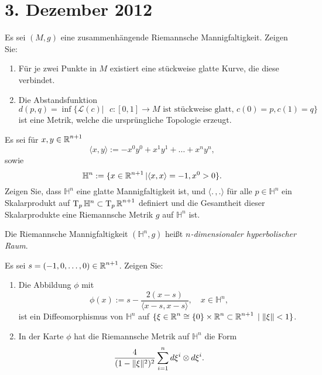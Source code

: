 
\section{3. Dezember 2012}
\setcounter{Aufg}{0} %
\setcounter{Loes}{0}

\begin{Aufg}
Es sei $(M,g)$ eine zusammenhängende Riemannsche Mannigfaltigkeit. Zeigen Sie:
\begin{enumerate}[label=\alph*),leftmargin=*,widest=b]
\item
	Für je zwei Punkte in $M$ existiert eine stückweise glatte Kurve, die diese verbindet.
\item
	Die Abstandsfunktion 
		\[d(p,q)=\inf\{\mathcal{L}(c)|\text{ $c:[0,1] \to M$ ist stückweise glatt, } c(0)=p, c(1)=q\}\]
	ist eine Metrik, welche die ursprüngliche Topologie erzeugt.
\end{enumerate}\end{Aufg}

\begin{Aufg}
Es sei für $x,y\in \operatorname{\mathbb{R}}^{n+1}$ 
	\[\langle x,y \rangle:= - x^0 y^0 + x^1 y^1 +\dots + x^n y^n,\]
sowie 
	\[\mathbb{H}^n:= \{x\in \operatorname{\mathbb{R}}^{n+1}| \langle x,x \rangle =-1, x^0 > 0\}.\]
Zeigen Sie, dass $\mathbb{H}^n$ eine glatte Mannigfaltigkeit ist, und $\langle. \,, . \rangle$ für alle $p\in \mathbb{H}^n$ ein Skalarprodukt auf $\operatorname{T}_p \mathbb{H}^n \subset \operatorname{T}_p \operatorname{\mathbb{R}}^{n+1}$   definiert und die Gesamtheit dieser Skalarprodukte eine Riemannsche Metrik $g$ auf $\mathbb{H}^n$ ist.

Die Riemannsche Mannigfaltigkeit $(\mathbb{H}^n, g)$ heißt \emph{$n$-dimensionaler hyperbolischer Raum}.
\end{Aufg}

\begin{Aufg}
Es sei $s=(-1,0,\dots,0) \in \operatorname{\mathbb{R}}^{n+1}$. Zeigen Sie:
\begin{enumerate}[label=\alph*),leftmargin=*,widest=b]
\item
	Die Abbildung $\phi$ mit 
		\[\phi(x):=s-\frac{2 (x-s)}{\langle x-s,x-s\rangle}, \quad x\in \mathbb{H}^n, \]
	ist ein Diffeomorphismus von $\mathbb{H}^n$ auf $\{\xi \in \operatorname{\mathbb{R}}^n \cong \{0\} \times \operatorname{\mathbb{R}}^n\subset \operatorname{\mathbb{R}}^{n+1}\;|\; \| \xi\|<1\}$.
\item
	In der Karte $\phi$ hat die Riemannsche Metrik auf $\mathbb{H}^n$ die Form \[ \frac{4}{(1-\|\xi \|^2)^2} \sum_{i=1}^nd\xi^i \otimes d\xi^i.\] 
\end{enumerate}\end{Aufg}

